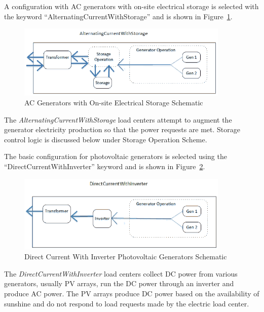 A configuration with AC generators with on-site electrical storage is selected with the keyword “AlternatingCurrentWithStorage” and is shown in Figure~\ref{fig:ac-generators-with-on-site-electrical-storage}. 

\begin{figure}[hbtp] %
\centering
\includegraphics[width=0.9\textwidth, height=0.9\textheight, keepaspectratio=true]{media/ACStorageBussDiagram.png}
\caption{AC Generators with On-site Electrical Storage Schematic \protect \label{fig:ac-generators-with-on-site-electrical-storage}}
\end{figure}

The \emph{AlternatingCurrentWithStorage} load centers attempt to augment the generator electricity production so that the power requests are met. Storage control logic is discussed below under Storage Operation Scheme.

The basic configuration for photovoltaic generators is selected using the “DirectCurrentWithInverter” keyword and is shown in Figure~\ref{fig:direct-current-with-inverter-photovoltaic}.

\begin{figure}[hbtp] %
\centering
\includegraphics[width=0.9\textwidth, height=0.9\textheight, keepaspectratio=true]{media/DCInverterBussDiagram.png}
\caption{Direct Current With Inverter Photovoltaic Generators Schematic \protect \label{fig:direct-current-with-inverter-photovoltaic}}
\end{figure}

The \emph{DirectCurrentWithInverter} load centers collect DC power from various generators, usually PV arrays, run the DC power through an inverter and produce AC power. The PV arrays produce DC power based on the availability of sunshine and do not respond to load requests made by the electric load center. 

